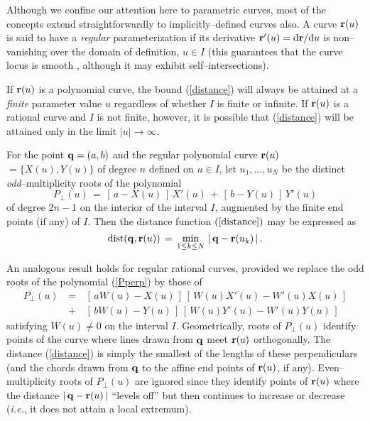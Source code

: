 Although we confine our attention here to parametric curves, most
of the concepts extend straightforwardly to implicitly--defined
curves also. A curve ${\bf r}(u)$ is said to have a {\it regular\/}
parameterization if its derivative ${\bf r}'(u)={\rm d}{\bf r}/{\rm d} u$
is non--vanishing over the domain of definition, $u \in I$ (this
guarantees that the curve locus is smooth \cite{farouki92},
although it may exhibit self--intersections).

If ${\bf r}(u)$ is a polynomial curve, the bound (\ref{distance})
will always be attained at a {\it finite\/} parameter value $u$
regardless of whether $I$ is finite or infinite. If ${\bf r}(u)$
is a rational curve and $I$ is not finite, however, it is possible
that (\ref{distance}) will be attained only in the limit $|u|\to
\infty$.

\begin{rmk} \label{polydist} {\rm
For the point ${\bf q}=(a,b)$ and the regular polynomial curve
${\bf r}(u)$ $=\{X(u),Y(u)\}$ of degree $n$ defined on $u \in I$,
let $u_1,\ldots,u_N$ be the distinct {\it odd}--multiplicity roots
of the polynomial
\begin{equation} \label{Pperp}
P_\perp(u) \,=\,
[\,a-X(u)\,]\,X'(u) \,+\, [\,b-Y(u)\,]\,Y'(u)
\end{equation}
of degree $2n-1$ on the interior of the interval $I$, augmented by
the finite end points (if any) of $I$. Then the distance function
$(\ref{distance})$ may be expressed as
\begin{equation} \label{distance2}
{\rm dist}({\bf q},{\bf r}(u)) \,=\,
\min_{1 \le k \le N} \, |\,{\bf q}-{\bf r}(u_k)\,| \,.
\end{equation}
} \end{rmk}

An analogous result holds for regular rational curves, provided we
replace the odd roots of the polynomial (\ref{Pperp}) by those of
\begin{eqnarray} \label{Rperp}
P_\perp(u)
&\,=\,& [\,aW(u)-X(u)\,]\,[\,W(u)X'(u)-W'(u)X(u)\,] \nonumber \\
&\,+\,& [\,bW(u)-Y(u)\,]\,[\,W(u)Y'(u)-W'(u)Y(u)\,]
\end{eqnarray}
satisfying $W(u)\not=0$ on the interval $I$. Geometrically,
roots of $P_\perp(u)$ identify points of the curve where lines
drawn from ${\bf q}$ meet ${\bf r}(u)$ orthogonally. The distance
(\ref{distance}) is simply the smallest of the lengths of these
perpendiculars (and the chords drawn from ${\bf q}$ to the affine
end points of ${\bf r}(u)$, if any). Even--multiplicity roots of
$P_\perp(u)$ are ignored since they identify points of ${\bf r}(u)$
where the distance $|\,{\bf q}-{\bf r}(u)\,|$ ``levels off'' but
then continues to increase or decrease ({\it i.e.}, it does not
attain a local extremum).

